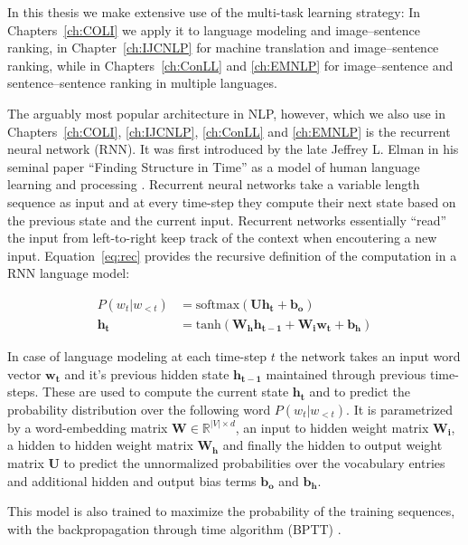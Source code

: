 In this thesis we make extensive use of the  multi-task learning strategy: 
In Chapters~\ref{ch:COLI} we apply it to language modeling and image--sentence ranking, 
in Chapter~\ref{ch:IJCNLP} for machine translation
and image--sentence ranking, while in Chapters~\ref{ch:ConLL} and \ref{ch:EMNLP} for image--sentence
and sentence--sentence ranking in multiple languages.

The arguably most popular architecture in NLP, however, which we also use in
Chapters~\ref{ch:COLI}, \ref{ch:IJCNLP}, \ref{ch:ConLL} and \ref{ch:EMNLP}
is the recurrent neural network (RNN). It was
first introduced by the late Jeffrey L. Elman in his seminal paper  ``Finding Structure in Time''
as a model of human language learning and processing \citep{elman1990finding}. Recurrent neural networks
take a variable length sequence as input and at every time-step they compute their next state
based on the previous state and the current input. Recurrent networks 
essentially ``read'' the input from left-to-right keep track of the context when encoutering a new input.
Equation~\ref{eq:rec} provides the recursive definition of the computation in a RNN language model:

\begin{align}
\label{eq:rec}
P(w_t|w_{<t}) &= \text{softmax}(\mathbf{U} \mathbf{h_t} + \mathbf{b_o}) \\
\mathbf{h_t} &= \text{tanh}(\mathbf{W_h}\mathbf{h_{t-1}} + \mathbf{W_i}\mathbf{w_t} + \mathbf{b_h})
\end{align}

In case of language modeling at each time-step $t$ the network takes an input word vector $\mathbf{w_t}$
and it's previous hidden state $\mathbf{h_{t-1}}$ maintained through previous
time-steps. These are used to compute the current
state $\mathbf{h_t}$ and to predict the probability distribution over the following word $P(w_t|w_{<t})$.
It is parametrized by a word-embedding matrix $\mathbf{W} \in \mathbb{R}^{|V| \times d}$,
an input to hidden weight matrix $\mathbf{W_i}$, a hidden to hidden weight
matrix $\mathbf{W_h}$ and finally the hidden to output
weight matrix $\mathbf{U}$ to predict the unnormalized probabilities over the vocabulary entries and additional
hidden and output bias terms $ \mathbf{b_o}$ and $ \mathbf{b_h}$.



This model is also trained to maximize the probability of the training sequences, 
with the backpropagation through time algorithm (BPTT)
\citep{robinson1987utility,werbos1988generalization,williams1995gradient}.

